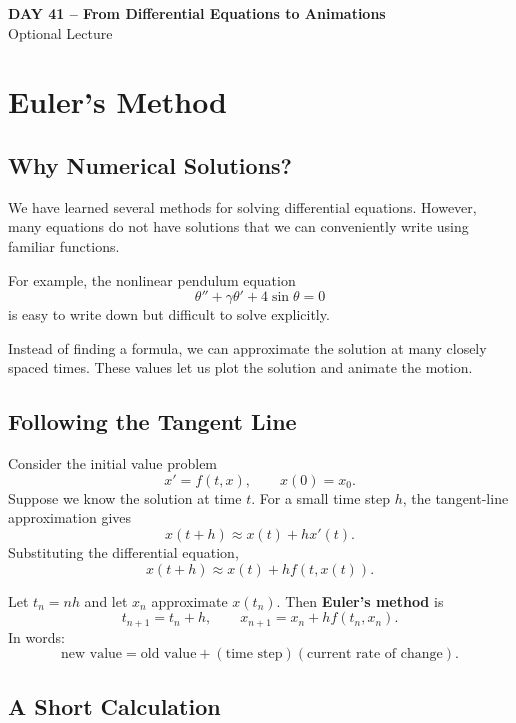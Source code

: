 \documentclass[10pt,letterpaper]{article}
\begin{document}
\begin{center}
\Large\textbf{DAY 41 -- From Differential Equations to Animations}\\
\normalsize Optional Lecture
\end{center}

\section{Euler's Method}

\subsection{Why Numerical Solutions?}

We have learned several methods for solving differential
equations. However, many equations do not have solutions
that we can conveniently write using familiar functions.

For example, the nonlinear pendulum equation
\[
\theta''+\gamma\theta'+4\sin\theta=0
\]
is easy to write down but difficult to solve explicitly.

Instead of finding a formula, we can approximate
the solution at many closely spaced times.
These values let us plot the solution and animate
the motion.

\subsection{Following the Tangent Line}

Consider the initial value problem
\[
x'=f(t,x),\qquad x(0)=x_0.
\]
Suppose we know the solution at time $t$.
For a small time step $h$, the tangent-line approximation
gives
\[
x(t+h)\approx x(t)+hx'(t).
\]
Substituting the differential equation,
\[
x(t+h)\approx x(t)+hf(t,x(t)).
\]

Let $t_n=nh$ and let $x_n$ approximate $x(t_n)$.
Then \textbf{Euler's method} is
\[
\boxed{
t_{n+1}=t_n+h,
\qquad
x_{n+1}=x_n+hf(t_n,x_n).
}
\]
In words:
\[
\text{new value}
=
\text{old value}
+
(\text{time step})(\text{current rate of change}).
\]

\subsection{A Short Calculation}
\end{document}
